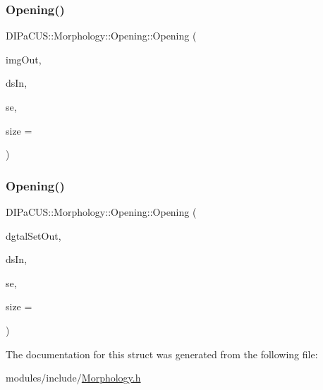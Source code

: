 \subsubsection{\texorpdfstring{Opening()}{Opening()}\hspace{0.1cm}{\footnotesize\ttfamily [1/2]}}
{\footnotesize\ttfamily D\+I\+Pa\+C\+U\+S\+::\+Morphology\+::\+Opening\+::\+Opening (\begin{DoxyParamCaption}\item[{\mbox{\hyperlink{namespaceDIPaCUS_1_1Morphology_a9aff9edf28d681accfc54435fbefcbee}{Image2D}} \&}]{img\+Out,  }\item[{const \mbox{\hyperlink{namespaceDIPaCUS_1_1Morphology_ab69fa725716b0ed4c311c0d00a292be7}{Digital\+Set}} \&}]{ds\+In,  }\item[{\mbox{\hyperlink{namespaceDIPaCUS_1_1Morphology_a60b552d68432e7992f09717070d9c4e7}{Structuring\+Element}}}]{se,  }\item[{int}]{size = {} }\end{DoxyParamCaption})\hspace{0.3cm}{\ttfamily [inline]}}

\mbox{\label{structDIPaCUS_1_1Morphology_1_1Opening_abef71bdce6c02360740c782b11bfdfa1}} 
\subsubsection{\texorpdfstring{Opening()}{Opening()}\hspace{0.1cm}{\footnotesize\ttfamily [2/2]}}
{\footnotesize\ttfamily D\+I\+Pa\+C\+U\+S\+::\+Morphology\+::\+Opening\+::\+Opening (\begin{DoxyParamCaption}\item[{\mbox{\hyperlink{namespaceDIPaCUS_1_1Morphology_ab69fa725716b0ed4c311c0d00a292be7}{Digital\+Set}} \&}]{dgtal\+Set\+Out,  }\item[{const \mbox{\hyperlink{namespaceDIPaCUS_1_1Morphology_ab69fa725716b0ed4c311c0d00a292be7}{Digital\+Set}} \&}]{ds\+In,  }\item[{\mbox{\hyperlink{namespaceDIPaCUS_1_1Morphology_a60b552d68432e7992f09717070d9c4e7}{Structuring\+Element}}}]{se,  }\item[{int}]{size = {} }\end{DoxyParamCaption})\hspace{0.3cm}{\ttfamily [inline]}}



The documentation for this struct was generated from the following file\+:\begin{DoxyCompactItemize}
\item 
modules/include/\mbox{\hyperlink{Morphology_8h}{Morphology.\+h}}\end{DoxyCompactItemize}
